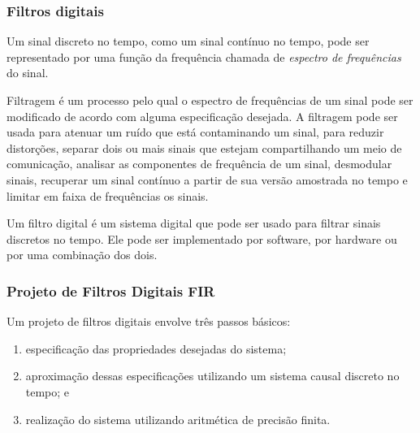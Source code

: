 \documentclass[12pt,addpoints]{exam}
\begin{document}
\subsubsection{Filtros digitais}
\label{sec:filtros}

Um sinal discreto no tempo, como um sinal contínuo no tempo, pode ser representado por uma função da frequência chamada de \textit{espectro de frequências} do sinal.  

Filtragem é um processo pelo qual o espectro de frequências de um sinal pode ser modificado de acordo com alguma especificação desejada. A filtragem pode ser usada para atenuar um ruído que está contaminando um sinal, para reduzir distorções, separar dois ou mais sinais que estejam compartilhando um meio de comunicação, analisar as componentes de frequência de um sinal, desmodular sinais, recuperar um sinal contínuo a partir de sua versão amostrada no tempo e limitar em faixa de frequências os sinais.

Um filtro digital é um sistema digital que pode ser usado para filtrar sinais discretos no tempo. Ele pode ser implementado por software, por hardware ou por uma combinação dos dois.

\subsubsection{Projeto de Filtros Digitais FIR } \label{sec:fir}

Um projeto de filtros digitais envolve três passos básicos:
\begin{enumerate}
    \item especificação das propriedades desejadas do sistema;
    \item aproximação dessas especificações utilizando um sistema causal
    discreto no tempo; e
    \item realização do sistema utilizando aritmética de precisão finita.
\end{enumerate}
\end{document}
